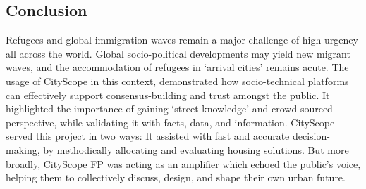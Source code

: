 {    \subsection{Conclusion}
    {
        Refugees and global immigration waves remain a major challenge of high urgency all across the world. Global socio-political developments may yield new migrant waves, and the accommodation of refugees in `arrival cities' remains acute. The usage of CityScope in this context, demonstrated how socio-technical platforms can effectively support consensus-building and trust amongst the public. It highlighted the importance of gaining `street-knowledge' and crowd-sourced perspective, while validating it with facts, data, and information. CityScope served this project in two ways: It assisted with fast and accurate decision-making, by methodically allocating and evaluating housing solutions. But more broadly, CityScope FP was acting as an amplifier which echoed the public's voice, helping them to collectively discuss, design, and shape their own urban future.
    }
}